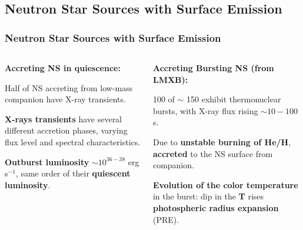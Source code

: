 \subsection*{Neutron Star Sources with Surface Emission}
\begin{frame}
\frametitle{Neutron Star Sources with Surface Emission}

\begin{columns}[c]
\begin{column}{0.5\textwidth} 
 \scriptsize{
 \item {\bf Accreting NS in quiescence:} \\
 
 \quad
 
 \begin{itemize}\scriptsize{
 \item  Half of NS accreting from low-mass companion have X-ray transients.
 
 
 
 \quad
 
  \item {\bf X-rays transients} have several different accretion phases, varying flux level and spectral characteristics.
  
  \quad
  
  \item {\bf Outburst luminosity} $\sim 10^{36-38}$ erg s$^{-1}$, same order of their {\bf quiescent luminosity}.}
 \end{itemize}}

 


\end{column}
\begin{column}{0.65\textwidth}   

 \scriptsize{
 
\item {\bf Accreting Bursting NS (from LMXB):}\\

\quad

\begin{itemize}\scriptsize{

\item 100 of $\sim$ 150 exhibit thermonuclear bursts, with X-ray flux rising $\sim 10-100$ s.

\quad

 \item Due to {\bf unstable burning of He/H}, {\bf accreted} to the NS surface from companion.
 
 \quad
 
 \item  {\bf Evolution of the color temperature} in the burst: dip in the {\bf T} rises {\bf photospheric radius expansion} (PRE).
 

 
 }
 
 
\end{itemize}
} 

\end{column}
\end{columns}
\end{frame}


